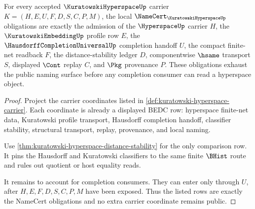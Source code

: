 \begin{theorem}
\label{thm:kuratowski-hyperspace-namecert-obligations}
For every accepted $\KuratowskiHyperspaceUp$ carrier $K=(H,E,U,F,D,S,C,P,M)$, the local $\NameCert_{\KuratowskiHyperspaceUp}$ obligations are exactly the admission of the $\HyperspaceUp$ carrier $H$, the $\KuratowskiEmbeddingUp$ profile row $E$, the $\HausdorffCompletionUniversalUp$ completion handoff $U$, the compact finite-net readback $F$, the distance-stability ledger $D$, componentwise $\hsame$ transport $S$, displayed $\Cont$ replay $C$, and $\Pkg$ provenance $P$. These obligations exhaust the public naming surface before any completion consumer can read a hyperspace object.
\end{theorem}
\begin{proof}
Project the carrier coordinates listed in \autoref{def:kuratowski-hyperspace-carrier}. Each coordinate is already a displayed BEDC row: hyperspace finite-net data, Kuratowski profile transport, Hausdorff completion handoff, classifier stability, structural transport, replay, provenance, and local naming.

Use \autoref{thm:kuratowski-hyperspace-distance-stability} for the only comparison row. It pins the Hausdorff and Kuratowski classifiers to the same finite $\BHist$ route and rules out quotient or host equality reads.

It remains to account for completion consumers. They can enter only through $U$, after $H,E,F,D,S,C,P,M$ have been exposed. Thus the listed rows are exactly the NameCert obligations and no extra carrier coordinate remains public.
\end{proof}


\begin{closurestatus}{\KuratowskiHyperspaceUp}
  \theoryclosure{\seedClosure}
  \formalstatus{\unformalizedV}
\end{closurestatus}
